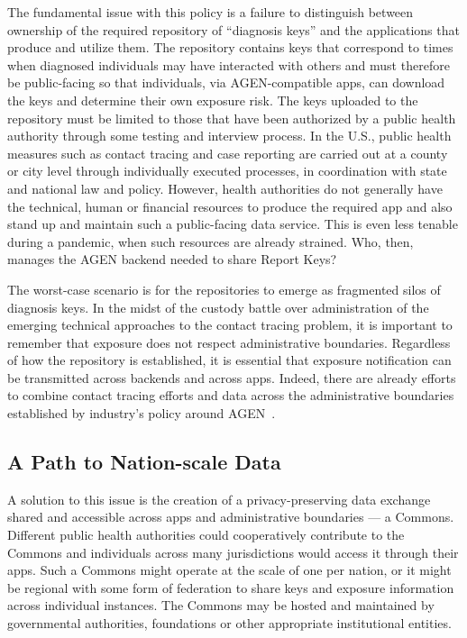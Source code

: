 The fundamental issue with this policy is a failure to distinguish between ownership of the required repository of ``diagnosis keys'' and the applications that produce and utilize them.
The repository contains keys that correspond to times when diagnosed individuals may have interacted with others and must therefore be public-facing so that individuals, via AGEN-compatible apps, can download the keys and determine their own exposure risk.
The keys uploaded to the repository must be limited to those that have been authorized by a public health authority through some testing and interview process.
In the U.S., public health measures such as contact tracing and case reporting are carried out at a county or city level through individually executed processes, in coordination with state and national law and policy.
However, health authorities do not generally have the technical, human or financial resources to produce the required app and also stand up and maintain such a public-facing data service.
This is even less tenable during a pandemic, when such resources are already strained.
Who, then, manages the AGEN backend needed to share Report Keys?

The worst-case scenario is for the repositories to emerge as fragmented silos of diagnosis keys.
In the midst of the custody battle over administration of the emerging technical approaches to the contact tracing problem, it is important to remember that exposure does not respect administrative boundaries.
Regardless of how the repository is established, it is essential that exposure notification can be transmitted across backends and across apps.
Indeed, there are already efforts to combine contact tracing efforts and data across the administrative boundaries established by industry's policy around AGEN~\cite{tri_state_coalition}.

\subsection{A Path to Nation-scale Data}

A solution to this issue is the creation of a privacy-preserving data exchange shared and accessible across apps and administrative boundaries --- a Commons.
Different public health authorities could cooperatively contribute to the Commons and individuals across many jurisdictions would access it through their apps.
Such a Commons might operate at the scale of one per nation, or it might be regional with some form of federation to share keys and exposure information across individual instances.
The Commons may be hosted and maintained by governmental authorities, foundations or other appropriate institutional entities.

